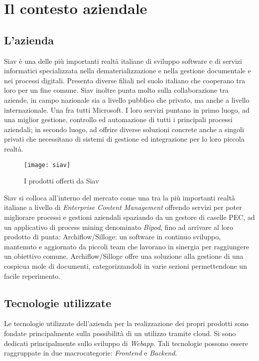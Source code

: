 
\chapter{Il contesto aziendale}

\section{L'azienda}
Siav è una delle più importanti realtà italiane di sviluppo software e di servizi informatici
specializzata nella dematerializzazione e nella gestione documentale e nei processi
digitali. Presenta diverse filiali nel suolo italiano che cooperano tra loro per un fine comune. Siav inoltre punta molto sulla collaborazione tra aziende, in campo nazionale sia a livello pubblico che privato, ma anche a livello internazionale. Una fra tutti Microsoft.
I loro servizi puntano in primo luogo, ad una miglior gestione, controllo ed automazione di tutti i principali processi aziendali; in secondo luogo, ad offrire diverse soluzioni concrete anche a singoli privati che necessitano di sistemi di gestione ed integrazione per lo loro piccola realtà.
\begin{figure}[!h] 
	\centering 
	\texttt{[image: siav]} 
	\caption{I prodotti offerti da Siav}
\end{figure}
Siav si colloca all'interno del mercato come una tra la più importanti realtà italiane a livello di \textit{Enterprise Content Management} offrendo servizi per poter migliorare processi e gestioni aziendali spaziando da un gestore di caselle PEC, ad un applicativo di process mining denominato \textit{Bipod}, fino ad arrivare al loro prodotto di punta: Archiflow/Silloge: un software in continuo sviluppo, mantenuto e aggiornato da piccoli team che lavorano in sinergia per raggiungere un obiettivo comune. Archiflow/Silloge offre una soluzione alla gestione di una cospicua mole di documenti, categorizzandoli in varie sezioni permettendone un facile reperimento.

\section {Tecnologie utilizzate}
Le tecnologie utilizzate dell'azienda per la realizzazione dei propri prodotti sono fondate principalmente sulla possibilità di un utilizzo tramite cloud. Si sono dedicati principalmente sullo sviluppo di \textit{Webapp}. Tali tecnologie possono essere raggruppate in due macrocategorie: \textit{Frontend} e \textit{Backend}.
